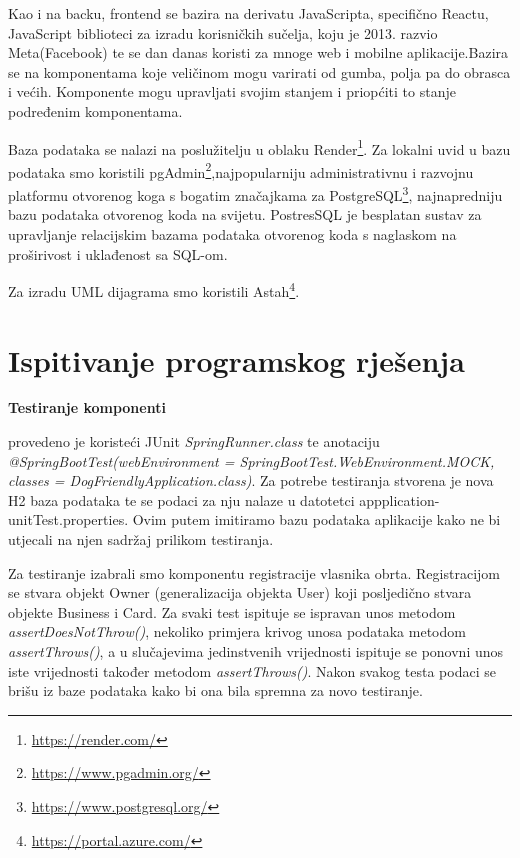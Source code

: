         Kao i na backu, frontend se bazira na derivatu JavaScripta, specifično Reactu, JavaScript biblioteci za izradu korisničkih sučelja, koju je 2013. razvio Meta(Facebook) te se dan danas koristi za mnoge web i mobilne aplikacije.Bazira se na komponentama koje veličinom mogu varirati od gumba, polja pa do obrasca i većih. Komponente mogu upravljati svojim stanjem i priopćiti to stanje podređenim komponentama.

        Baza podataka se nalazi na poslužitelju u oblaku Render\footnote{\url{https://render.com/}}. Za lokalni uvid u bazu podataka smo koristili pgAdmin\footnote{\url{https://www.pgadmin.org/}},najpopularniju administrativnu i razvojnu platformu otvorenog koga s bogatim značajkama za PostgreSQL\footnote{\url{https://www.postgresql.org/}}, najnapredniju bazu podataka otvorenog koda na svijetu. PostresSQL je besplatan sustav za upravljanje relacijskim bazama podataka otvorenog koda s naglaskom na proširivost i uklađenost sa SQL-om.

        Za izradu UML dijagrama smo koristili Astah\footnote{\url{https://portal.azure.com/}}.

        
        
        \newpage
		\section{Ispitivanje programskog rješenja}
  
        \textbf{Testiranje komponenti}{ provedeno je koristeći JUnit \textit{SpringRunner.class} te anotaciju \textit{@SpringBootTest(webEnvironment = SpringBootTest.WebEnvironment.MOCK, classes = DogFriendlyApplication.class)}. Za potrebe testiranja stvorena je nova H2 baza podataka te se podaci za nju nalaze u datotetci appplication-unitTest.properties. Ovim putem imitiramo bazu podataka aplikacije kako ne bi utjecali na njen sadržaj prilikom testiranja.
         
         Za testiranje izabrali smo komponentu registracije vlasnika obrta. Registracijom se stvara objekt Owner (generalizacija objekta User) koji posljedično stvara objekte Business i Card. Za svaki test ispituje se ispravan unos metodom \textit{assertDoesNotThrow()}, nekoliko primjera krivog unosa podataka metodom \textit{assertThrows()}, a u slučajevima jedinstvenih vrijednosti ispituje se ponovni unos iste vrijednosti također metodom \textit{assertThrows()}. Nakon svakog testa podaci se brišu iz baze podataka kako bi ona bila spremna za novo testiranje.}
         \newline

